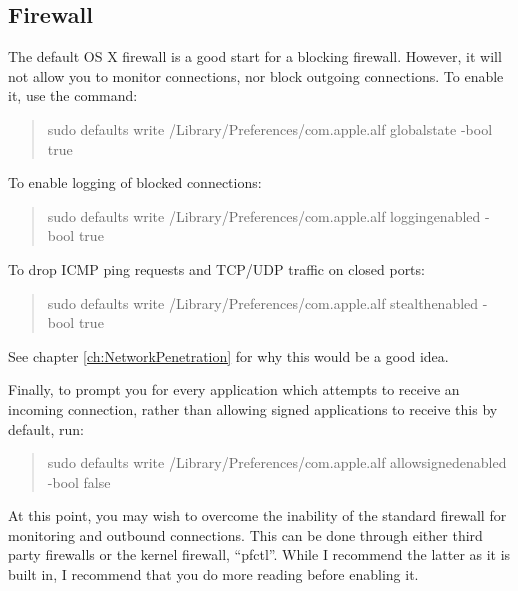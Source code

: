 \documentclass[a4paper,11pt]{report}
\begin{document}
		\subsection{Firewall}
			The default OS X firewall is a good start for a blocking firewall. 
			However, it will not allow you to monitor connections, nor block outgoing connections.
			To enable it, use the command:
			\begin{quote}
				sudo defaults write /Library/Preferences/com.apple.alf globalstate -bool true
			\end{quote}
			To enable logging of blocked connections:
			\begin{quote}
				sudo defaults write /Library/Preferences/com.apple.alf loggingenabled -bool true
			\end{quote}
			To drop ICMP ping requests and TCP/UDP traffic on closed ports:
			\begin{quote}
				sudo defaults write /Library/Preferences/com.apple.alf stealthenabled -bool true
			\end{quote}
			See chapter \ref{ch:NetworkPenetration} for why this would be a good idea. 

			Finally, to prompt you for every application which attempts to receive an incoming connection, rather than allowing signed applications to receive this by default, run:
			\begin{quote}
				sudo defaults write /Library/Preferences/com.apple.alf allowsignedenabled -bool false
			\end{quote}

			At this point, you may wish to overcome the inability of the standard firewall for monitoring and outbound connections. 
			This can be done through either third party firewalls or the kernel firewall, ``pfctl''. 
			While I recommend the latter as it is built in, I recommend that you do more reading before enabling it. 
\end{document}
